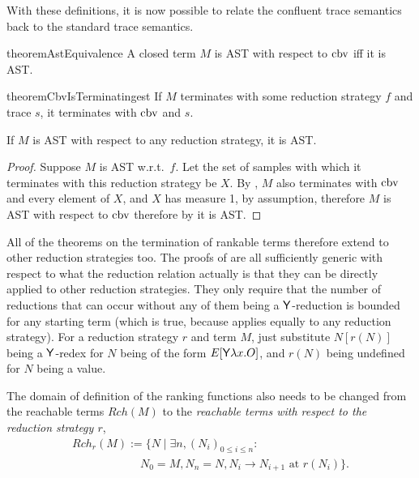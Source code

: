 With these definitions, it is now possible to relate the confluent trace semantics back to the standard trace semantics.

\begin{restatable}{theorem}{AstEquivalence} \label{thm:AstEquivalence}
A closed term $M$ is AST with respect to $\operatorname{cbv}$ iff it is AST.
\end{restatable}

\begin{restatable}{theorem}{CbvIsTerminatingest} \label{thm:CbvIsTerminatingest}
If $M$ terminates with some reduction strategy $f$ and trace $s$, it terminates with $\operatorname{cbv}$ and $s$.
\end{restatable}

\begin{corollary}
\label{cor:Reduction strategy independence}
If $M$ is AST with respect to any reduction strategy, it is AST.
\end{corollary}
\begin{proof}
Suppose $M$ is AST w.r.t.~$f$. Let the set of samples with which it terminates with this reduction strategy be $X$. By , $M$ also terminates with $\operatorname{cbv}$ and every element of $X$, and $X$ has measure 1, by assumption, therefore $M$ is AST with respect to $\operatorname{cbv}$ therefore by  it is AST.
\end{proof}

All of the theorems on the termination of rankable terms therefore extend to other reduction strategies too. The proofs of  are all sufficiently generic with respect to what the reduction relation actually is that they can be directly applied to other reduction strategies. They only require that the number of reductions that can occur without any of them being a $\mathsf{Y}$-reduction is bounded for any starting term (which is true, because  applies equally to any reduction strategy). For a reduction strategy $r$ and term $M$, just substitute $N[r(N)]$ being a $\mathsf{Y}$-redex for $N$ being of the form $E[\mathsf{Y} \lambda x. O]$, and $r(N)$ being undefined for $N$ being a value.

The domain of definition of the ranking functions also needs to be changed from the reachable terms $\mathit{Rch}(M)$ to the \emph{reachable terms with respect to the reduction strategy $r$},
\[
\begin{array}{l}
\mathit{Rch}_r(M) := \{N \mid \exists n, (N_i)_{0 \leq i \leq n} : {}\\
\qquad\qquad\qquad N_0 = M, N_n = N, N_i \to N_{i+1} \text{ at } r(N_i)\}.
\end{array}
\]

